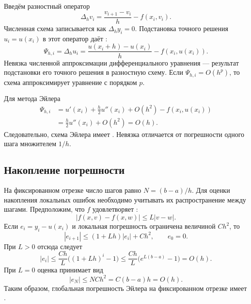 \documentclass[../final.tex]{subfiles}
\begin{document}
Введём разностный оператор
\begin{equation*}
    \Delta_h v_i=\frac{v_{i+1}-v_i}{h}-f(x_i,v_i).
\end{equation*}
Численная схема записывается как $\Delta_h y_i=0$.
Подстановка точного решения $u_i=u(x_i)$ в этот оператор даёт
:
\begin{equation*}
    \Psi_{h,i}=\Delta_h u_i
    =\frac{u(x_i+h)-u(x_i)}h-f(x_i,u(x_i)).
\end{equation*}
Невязка численной аппроксимации дифференциального уравнения ---
результат подстановки его точного решения в разностную схему.
Если $\Psi_{h,i}=O(h^p)$, то схема аппроксимирует уравнение
с порядком $p$.

Для метода Эйлера
\begin{align*}
    \Psi_{h,i}
    &=u'(x_i)+\frac h2u''(x_i)+O(h^2)-f(x_i,u(x_i))\\
    &=\frac h2u''(x_i)+O(h^2)=O(h).
\end{align*}
Следовательно, схема Эйлера имеет .
Невязка отличается от погрешности одного шага множителем $1/h$.

\subsection{Накопление погрешности}

На фиксированном отрезке число шагов равно $N=(b-a)/h$.
Для оценки накопления локальных ошибок необходимо учитывать
их распространение между шагами.
Предположим, что $f$ удовлетворяет :
\begin{equation*}
    |f(x,v)-f(x,w)|\le L|v-w|.
\end{equation*}
Если $e_i=y_i-u(x_i)$ и локальная погрешность ограничена величиной $Ch^2$,
то
\begin{equation*}
    |e_{i+1}|\le(1+Lh)|e_i|+Ch^2,\qquad e_0=0.
\end{equation*}
При $L>0$ отсюда следует
\begin{equation*}
    |e_i|\le\frac{Ch}{L}\bigl((1+Lh)^i-1\bigr)
    \le\frac{Ch}{L}\bigl(e^{L(b-a)}-1\bigr)=O(h).
\end{equation*}
При $L=0$ оценка принимает вид
\begin{equation*}
    |e_N|\le NCh^2=C(b-a)h=O(h).
\end{equation*}
Таким образом, глобальная погрешность Эйлера на фиксированном отрезке
имеет .
\end{document}
